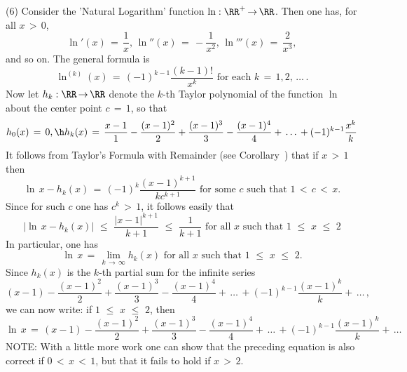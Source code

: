         (6) Consider the 'Natural Logarithm' function ${\ln}:{\RR}^{+} \,{\rightarrow}\, {\RR}$.
    Then one has, for all $x\,>\,0$,
        \begin{displaymath}
        {\ln}'(x) \,=\, \frac{1}{x}, \, {\ln}''(x) \,=\, -\frac{1}{x^{2}}, \, {\ln}'''(x) \,=\, \frac{2}{x^{3}},
        \end{displaymath}
    and so on. The general formula is
        \begin{displaymath}
        {\ln}^{(k)}(x) \,=\, (-1)^{k-1}\frac{(k-1)!}{x^{k}} \mbox{ for each $k \,=\, 1, 2, \,{\ldots}\,$}.
        \end{displaymath}
    Now let $h_{k}:{\RR} \,{\rightarrow}\, {\RR}$ denote the $k$-th Taylor polynomial of the function ${\ln}$ about the center point $c \,=\, 1$, so that
        \begin{displaymath}
        h_{0}(x) \,=\, 0, \h h_{k}(x) \,=\, \frac{x-1}{1} - \frac{(x-1)^{2}}{2} + \frac{(x-1)^{3}}{3} - \frac{(x-1)^{4}}{4} + \,{\ldots}\, + (-1)^{k-1}\frac{x^{k}}{k}
        \end{displaymath}
    It follows from Taylor's Formula with Remainder (see Corollary~) that if $x\,>\,1$ then
        \begin{displaymath}
        {\ln}\,x - h_{k}(x) \,=\, (-1)^{k}\frac{(x-1)^{k+1}}{kc^{k+1}} \mbox{ for some $c$ such that $1\,<\,c\,<\,x$}.
        \end{displaymath}
    Since for such $c$ one has $c^{k}\,>\,1$, it follows easily that
        \begin{displaymath}
        |{\ln}\,x-h_{k}(x)|\,\,{\leq}\,\,\frac{|x-1|^{k+1}}{k+1}\,\,{\leq}\,\,\frac{1}{k+1} \mbox{ for all $x$ such that $1\,\,{\leq}\,\,x\,\,{\leq}\,\,2$}
        \end{displaymath}
    In particular, one has
        \begin{displaymath}
        {\ln}\,x \,=\, \lim_{k \,{\rightarrow}\, {\infty}} h_{k}(x) \mbox{ for all $x$ such that $1\,\,{\leq}\,\,x\,\,{\leq}\,\,2$}.
        \end{displaymath}
    Since $h_{k}(x)$ is the $k$-th partial sum for the infinite series
        \begin{displaymath}
        (x-1) - \frac{(x-1)^{2}}{2} + \frac{(x-1)^{3}}{3} - \frac{(x-1)^{4}}{4} + \,{\ldots}\, + (-1)^{k-1}\frac{(x-1)^{k}}{k} + \,{\ldots}\,,
        \end{displaymath}
    we can now write: if $1\,\,{\leq}\,\,x\,\,{\leq}\,\,2$, then
        \begin{equation}
        \label{EqnG.60}
        {\ln}\,x \,=\, (x-1) - \frac{(x-1)^{2}}{2} + \frac{(x-1)^{3}}{3} - \frac{(x-1)^{4}}{4} + \,{\ldots}\, + (-1)^{k-1}\frac{(x-1)^{k}}{k} + \,{\ldots}\,
        \end{equation}
    NOTE: With a little more work one can show that the preceding equation is also correct if $0\,<\,x\,<\,1$, but that it fails to hold if  $x\,>\,2$.

